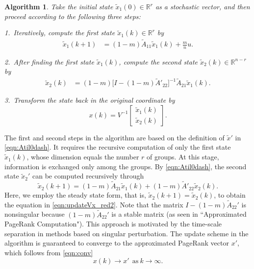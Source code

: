 \documentclass[11pt,draftcls,onecolumn]{IEEEtran}
\newtheorem{algorithm}[theorem]{Algorithm}
\newcommand{\field}[1]{{\mathbb{#1}}}
\newcommand{\one}{\mathbf{1}}
\newcommand{\R}{\field{R}}
\begin{document}
\begin{algorithm}
\label{alg:1}\rm 
Take the initial state $\widetilde{x}_1(0)\in\R^r$ as a stochastic vector, and 
then proceed according to the following three steps:

1.~Iteratively, compute the first state $\widetilde{x}_1(k)\in\R^r$ by
\begin{align}
 \widetilde{x}_1(k+1)
  &= (1-m)\widetilde{A}_{11} \widetilde{x}_1(k)
       + \frac{m}{n}u.
\label{eqn:updateVx_red1}
\end{align}

2.~After finding the first state $\widetilde{x}_1(k)$,
compute the second state $\widetilde{x}_2(k)\in\R^{n-r}$ by
\begin{align}
 \widetilde{x}_2(k)
  &= (1-m)\big[
            I - (1-m)\widetilde{A}'_{22}
          \big]^{-1}
           \widetilde{A}_{21} \widetilde{x}_1(k).
\label{eqn:updateVx_red2}
\end{align}

3.~Transform the state back in 
the original coordinate by
\begin{equation}
 x(k) = V^{-1} \begin{bmatrix}
                   \widetilde{x}_1(k)\\
                   \widetilde{x}_2(k)
               \end{bmatrix}.
 \label{eqn:updateVx_red3}
\end{equation}
\end{algorithm}

\medskip
The first and second steps in the algorithm are based on the
definition of $\widetilde{x}'$ in \eqref{eqn:Atil0dash}.
It requires the recursive computation of only the first state 
$\widetilde{x}_1(k)$, whose dimension 
equals the number $r$ of groups. At this stage, 
information is exchanged only among the groups.
By \eqref{eqn:Atil0dash}, the second state $\widetilde{x}_2'$ can
be computed recursively through
\[
 \widetilde{x}_2(k+1)
  = (1-m)\widetilde{A}_{21} \widetilde{x}_1(k)
     + (1-m) \widetilde{A}'_{22} \widetilde{x}_2(k).
\]
Here, we employ the steady state form, that is, $\widetilde{x}_2(k+1)=\widetilde{x}_2(k)$, 
to obtain the equation in \eqref{eqn:updateVx_red2}.
Note that the matrix $I - (1-m)\widetilde{A}_{22}'$ is nonsingular
because $(1-m)\widetilde{A}_{22}'$ is a stable matrix (as seen in 
``Approximated PageRank Computation").
This approach is motivated by the time-scale separation in methods based on
singular perturbation.
The update scheme in the algorithm is guaranteed to converge to 
the approximated PageRank vector $x'$, which follows from \eqref{eqn:conv}
\[
  x(k)\rightarrow x'~~\text{as}~k\rightarrow\infty.
\]
\end{document}
